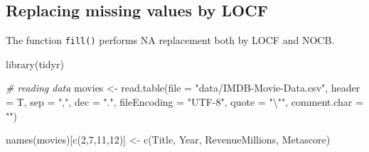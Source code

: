 \documentclass[
]{book}
\newenvironment{Shaded}{\begin{snugshade}}{\end{snugshade}}
\newcommand{\AttributeTok}[1]{\textcolor[rgb]{0.77,0.63,0.00}{#1}}
\newcommand{\CommentTok}[1]{\textcolor[rgb]{0.56,0.35,0.01}{\textit{#1}}}
\newcommand{\DecValTok}[1]{\textcolor[rgb]{0.00,0.00,0.81}{#1}}
\newcommand{\FunctionTok}[1]{\textcolor[rgb]{0.00,0.00,0.00}{#1}}
\newcommand{\NormalTok}[1]{#1}
\newcommand{\OtherTok}[1]{\textcolor[rgb]{0.56,0.35,0.01}{#1}}
\newcommand{\SpecialCharTok}[1]{\textcolor[rgb]{0.00,0.00,0.00}{#1}}
\newcommand{\StringTok}[1]{\textcolor[rgb]{0.31,0.60,0.02}{#1}}
\begin{document}
\hypertarget{replacing-missing-values-by-locf}{%
\subsection{Replacing missing values by LOCF}\label{replacing-missing-values-by-locf}}

The function \texttt{fill()} performs NA replacement both by LOCF and NOCB.

\begin{Shaded}
\begin{Highlighting}[]
\FunctionTok{library}\NormalTok{(tidyr)}


\CommentTok{\# reading data}
\NormalTok{movies }\OtherTok{\textless{}{-}} \FunctionTok{read.table}\NormalTok{(}\AttributeTok{file =} \StringTok{"data/IMDB{-}Movie{-}Data.csv"}\NormalTok{, }\AttributeTok{header =}\NormalTok{ T, }\AttributeTok{sep =} \StringTok{","}\NormalTok{, }\AttributeTok{dec =} \StringTok{"."}\NormalTok{, }\AttributeTok{fileEncoding =} \StringTok{"UTF{-}8"}\NormalTok{, }\AttributeTok{quote =} \StringTok{"}\SpecialCharTok{\textbackslash{}"}\StringTok{"}\NormalTok{,}
                  \AttributeTok{comment.char =} \StringTok{""}\NormalTok{)}


\FunctionTok{names}\NormalTok{(movies)[}\FunctionTok{c}\NormalTok{(}\DecValTok{2}\NormalTok{,}\DecValTok{7}\NormalTok{,}\DecValTok{11}\NormalTok{,}\DecValTok{12}\NormalTok{)] }\OtherTok{\textless{}{-}} \FunctionTok{c}\NormalTok{(}\StringTok{\textquotesingle{}Title\textquotesingle{}}\NormalTok{, }\StringTok{\textquotesingle{}Year\textquotesingle{}}\NormalTok{, }\StringTok{\textquotesingle{}RevenueMillions\textquotesingle{}}\NormalTok{, }\StringTok{\textquotesingle{}Metascore\textquotesingle{}}\NormalTok{)}


\end{Highlighting}
\end{Shaded}
\end{document}
